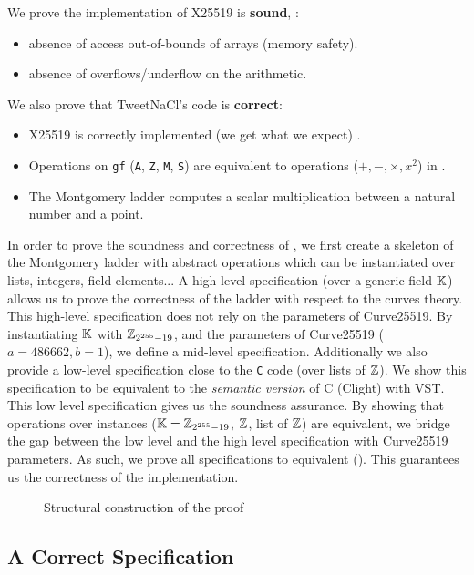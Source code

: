 We prove the implementation of X25519 is \textbf{sound}, \ie:
\begin{itemize}
\item absence of access out-of-bounds of arrays (memory safety).
\item absence of overflows/underflow on the arithmetic.
\end{itemize}
We also prove that TweetNaCl's code is \textbf{correct}:
\begin{itemize}
\item X25519 is correctly implemented (we get what we expect) .
\item Operations on \texttt{gf} (\texttt{A}, \texttt{Z}, \texttt{M}, \texttt{S})
are equivalent to operations ($+,-,\times,x^2$) in \Zfield.
\item The Montgomery ladder computes a scalar multiplication between a natural
number and a point.
\end{itemize}

In order to prove the soundness and correctness of ,
we first create a skeleton of the Montgomery ladder with abstract operations which
can be instantiated over lists, integers, field elements...
A high level specification (over a generic field $\mathbb{K}$) allows us to prove the
correctness of the ladder with respect to the curves theory.
This high-level specification does not rely on the parameters of Curve25519.
By instantiating $\mathbb{K}$ with $\mathbb{Z}_{2^{255}-19}$, and the parameters of Curve25519 ($a = 486662, b = 1$),
we define a mid-level specification.
Additionally we also provide a low-level specification close to the \texttt{C} code
(over lists of $\mathbb{Z}$). We show this specification to be equivalent to the
\textit{semantic version} of C (Clight) with VST.
This low level specification gives us the soundness assurance.
By showing that operations over instances ($\mathbb{K} = \mathbb{Z}_{2^{255}-19}$, $\mathbb{Z}$, list of $\mathbb{Z}$) are
equivalent, we bridge the gap between the low level and the high level specification
with Curve25519 parameters.
As such, we prove all specifications to equivalent ().
This guarantees us the correctness of the implementation.

\begin{figure}[h]
  \centering
  
  \caption{Structural construction of the proof}
  \label{tikz:ProofStructure}
\end{figure}





\subsection{A Correct Specification}

